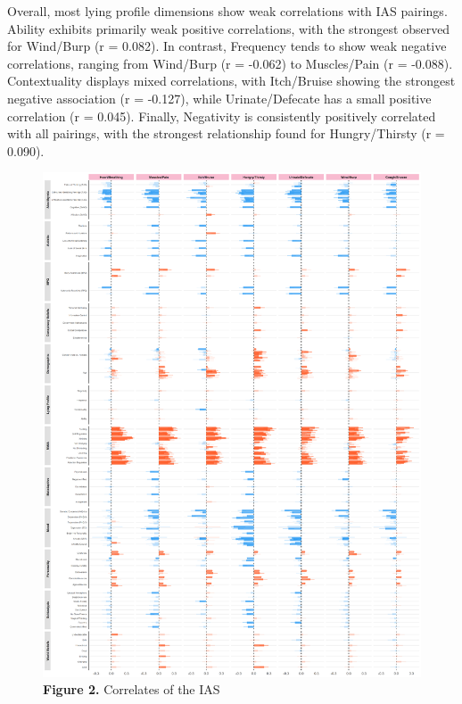 \documentclass[
  man,
  floatsintext,
  longtable,
  nolmodern,
  notxfonts,
  notimes,
  colorlinks=true,linkcolor=blue,citecolor=blue,urlcolor=blue]{apa7}
\begin{document}
Overall, most lying profile dimensions show weak correlations with IAS
pairings. Ability exhibits primarily weak positive correlations, with
the strongest observed for Wind/Burp (r = 0.082). In contrast, Frequency
tends to show weak negative correlations, ranging from Wind/Burp (r =
-0.062) to Muscles/Pain (r = -0.088). Contextuality displays mixed
correlations, with Itch/Bruise showing the strongest negative
association (r = -0.127), while Urinate/Defecate has a small positive
correlation (r = 0.045). Finally, Negativity is consistently positively
correlated with all pairings, with the strongest relationship found for
Hungry/Thirsty (r = 0.090).

\begin{figure}[H]

\caption{\textbf{Figure 2.} Correlates of the IAS}

{\centering \includegraphics[width=9.48958in,height=\textheight,keepaspectratio]{figures/clipboard-1619164537.png}

}

\end{figure}%
\end{document}
